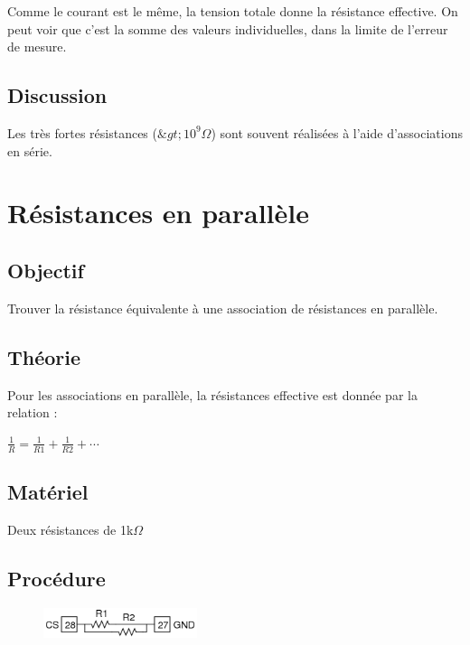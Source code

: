 \documentclass{book}
\begin{document}
Comme le courant est le même, la tension totale donne la résistance effective. On peut voir que c'est la somme des valeurs individuelles, dans la limite de l'erreur de mesure.

\subsection{Discussion}


Les très fortes résistances ($\&gt;10^{9}\Omega$) sont souvent réalisées à l'aide d'associations en série.







\section{Résistances en parallèle}



\subsection{Objectif}


Trouver la résistance équivalente à une association de résistances en parallèle.

\subsection{Théorie}


Pour les associations en parallèle, la résistances effective est donnée par la relation :



$\frac{1}{R}=\frac{1}{R1}+\frac{1}{R2}+\cdots$

\subsection{Matériel}


Deux résistances de 1k$\Omega$

\subsection{Procédure}


\begin{figure}[h!]
\begin{center}
\includegraphics[width=0.4\textwidth, height=0.3\textwidth, keepaspectratio]{Schematic-res-par.png}
\end{center}
\end{figure}
\end{document}
